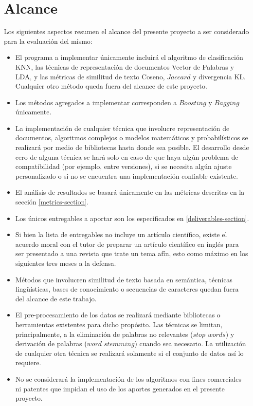 \section{Alcance}
Los siguientes aspectos resumen el alcance del presente proyecto a ser considerado para la evaluación del mismo:
\begin{itemize}
\item El programa a implementar únicamente incluirá el algoritmo de clasificación KNN, las técnicas de representación de documentos Vector de Palabras y LDA, y las métricas de similitud de texto Coseno, $Jaccard$ y divergencia KL. Cualquier otro método queda fuera del alcance de este proyecto.
\item Los métodos agregados a implementar corresponden a $Boosting$ y $Bagging$ únicamente.
\item La implementación de cualquier técnica que involucre representación de documentos, algoritmos complejos o modelos matemáticos y probabilísticos se realizará por medio de bibliotecas hasta donde sea posible. El desarrollo desde cero de alguna técnica se hará solo en caso de que haya algún problema de compatibilidad (por ejemplo, entre versiones), si se necesita algún ajuste personalizado o si no se encuentra una implementación confiable existente.
\item El análisis de resultados se basará únicamente en las métricas descritas en la sección \ref{metrics-section}. 
\item Los únicos entregables a aportar son los especificados en \ref{deliverables-section}. 
\item Si bien la lista de entregables no incluye un artículo científico, existe el acuerdo moral con el tutor de preparar un artículo científico en inglés para ser presentado a una revista que trate un tema afín, esto como máximo en los siguientes tres meses a la defensa.
\item Métodos que involucren similitud de texto basada en semántica, técnicas lingüísticas, bases de conocimiento o secuencias de caracteres quedan fuera del alcance de este trabajo.
\item El pre-procesamiento de los datos se realizará mediante bibliotecas o herramientas existentes para dicho propósito. Las técnicas se limitan, principalmente, a la eliminación de palabras no relevantes ($stop$ $words$) y derivación de palabras ($word$ $stemming$) cuando sea necesario. La utilización de cualquier otra técnica se realizará solamente si el conjunto de datos así lo requiere. 
\item No se considerará la implementación de los algoritmos con fines comerciales ni patentes que impidan el uso de los aportes generados en el presente proyecto.
\end{itemize}
